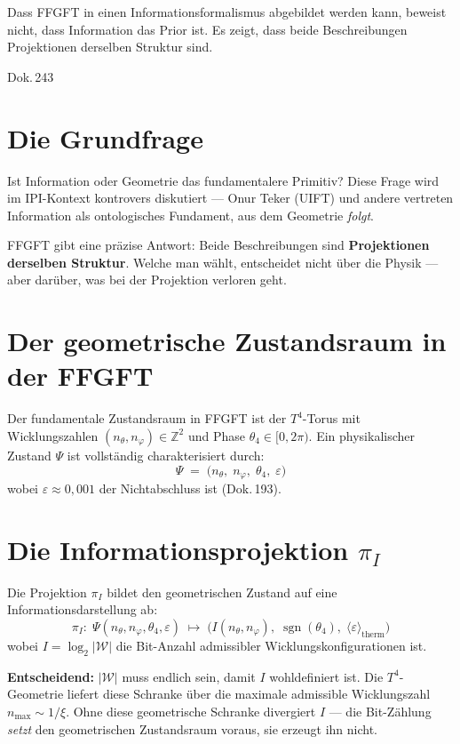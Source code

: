\label{ch:geometrie_vs_info}

\epigraph{Dass FFGFT in einen Informationsformalismus abgebildet werden kann,
beweist nicht, dass Information das Prior ist. Es zeigt, dass beide
Beschreibungen Projektionen derselben Struktur sind.}{Dok.\,243}

\section{Die Grundfrage}

Ist Information oder Geometrie das fundamentalere Primitiv? Diese Frage wird
im IPI-Kontext kontrovers diskutiert --- Onur Teker (UIFT) und andere vertreten
Information als ontologisches Fundament, aus dem Geometrie \emph{folgt}.

FFGFT gibt eine präzise Antwort: Beide Beschreibungen sind
\textbf{Projektionen derselben Struktur}. Welche man wählt, entscheidet nicht
über die Physik --- aber darüber, was bei der Projektion verloren geht.

\section{Der geometrische Zustandsraum in der FFGFT}

Der fundamentale Zustandsraum in FFGFT ist der $T^4$-Torus mit
Wicklungszahlen $(n_\theta, n_\varphi) \in \mathbb{Z}^2$ und Phase
$\theta_4 \in [0, 2\pi)$. Ein physikalischer Zustand $\Psi$ ist
vollständig charakterisiert durch:
\[
  \Psi \;=\; \bigl(n_\theta,\; n_\varphi,\; \theta_4,\; \varepsilon\bigr)
\]
wobei $\varepsilon \approx 0{,}001$ der Nichtabschluss ist (Dok.\,193).

\section{Die Informationsprojektion \texorpdfstring{$\pi_I$}{pi\_I}}

Die Projektion $\pi_I$ bildet den geometrischen Zustand auf eine
Informationsdarstellung ab:
\[
  \pi_I:\; \Psi(n_\theta, n_\varphi, \theta_4, \varepsilon)
  \;\longmapsto\;
  \bigl(I(n_\theta, n_\varphi),\;\operatorname{sgn}(\theta_4),\;
        \langle\varepsilon\rangle_\text{therm}\bigr)
\]
wobei $I = \log_2|\mathcal{W}|$ die Bit-Anzahl admissibler
Wicklungskonfigurationen ist.

\textbf{Entscheidend:} $|\mathcal{W}|$ muss endlich sein, damit $I$
wohldefiniert ist. Die $T^4$-Geometrie liefert diese Schranke über die maximale
admissible Wicklungszahl $n_\text{max} \sim 1/\xi$. Ohne diese geometrische
Schranke divergiert $I$ --- die Bit-Zählung \emph{setzt} den geometrischen
Zustandsraum voraus, sie erzeugt ihn nicht.

